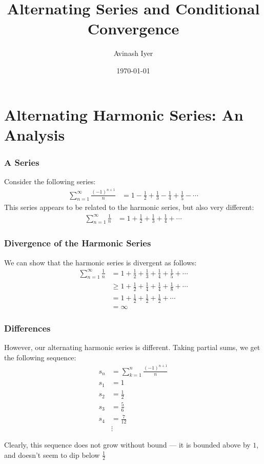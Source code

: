 \documentclass{beamer}
\title{Alternating Series and Conditional Convergence}
\author{Avinash Iyer}
\institute{Occidental College}
\date{\today} %
\begin{document}
\begin{frame}
    \titlepage
\end{frame}
\section{Alternating Harmonic Series: An Analysis}
\begin{frame}
  \frametitle{A Series}
  Consider the following series: \pause
  \begin{align*}
    \sum_{n=1}^{\infty} \frac{(-1)^{n + 1}}{n} &= 1 - \frac{1}{2} + \frac{1}{3} - \frac{1}{4} + \frac{1}{5} - \cdots
  \end{align*} \pause
  This series appears to be related to the harmonic series, but also very different:
  \begin{align*}
    \sum_{n=1}^{\infty}\frac{1}{n} &= 1 + \frac{1}{2} + \frac{1}{3} + \frac{1}{4} + \cdots \tag*{Harmonic Series}
  \end{align*}
\end{frame}
\begin{frame}
  \frametitle{Divergence of the Harmonic Series}
  We can show that the harmonic series is divergent as follows:
  \begin{align*}
    \sum_{n=1}^{\infty}\frac{1}{n} &= 1 + \frac{1}{2} + \frac{1}{3} + \frac{1}{4} + \frac{1}{5} + \cdots\\
                                   &\geq 1 + \frac{1}{2} + \frac{1}{4} + \frac{1}{4} + \frac{1}{8} + \cdots\\
                                   &= 1 + \frac{1}{2} + \frac{1}{2} + \frac{1}{2} + \cdots\\
                                   &= \infty
  \end{align*}
\end{frame}
\begin{frame}
  \frametitle{Differences}
  However, our alternating harmonic series is different. Taking partial sums, we get the following sequence:
  \begin{align*}
    s_{n} &= \sum_{k=1}^{n} \frac{(-1)^{n+1}}{n}\\
    s_{1} &= 1\\
    s_{2} &= \frac{1}{2}\\
    s_{3} &= \frac{5}{6}\\
    s_{4} &= \frac{7}{12}\\
          &\vdots
  \end{align*}
\end{frame}
\begin{frame}
  Clearly, this sequence does not grow without bound --- it is bounded above by $1$, and doesn't seem to dip below $\frac{1}{2}$
\end{frame}
\end{document}

